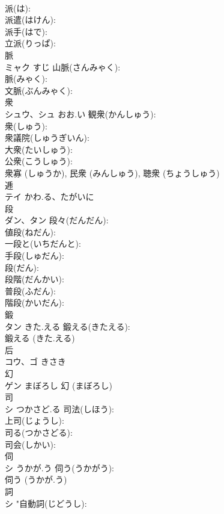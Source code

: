 \documentclass[8pt]{extreport}
\begin{document}
\begin{CJK}{UTF8}{min}
\\	派(は): 
\\	派遣(はけん): 
\\	派手(はで): 
\\	立派(りっぱ): 
\\	脈			
\\	ミャク	すじ	山脈(さんみゃく): 
\\	脈(みゃく): 
\\	文脈(ぶんみゃく): 
\\	衆			
\\	シュウ、シュ	おお.い	観衆(かんしゅう): 
\\	衆(しゅう): 
\\	衆議院(しゅうぎいん): 
\\	大衆(たいしゅう): 
\\	公衆(こうしゅう): 
\\	衆寡 (しゅうか), 民衆 (みんしゅう), 聴衆 (ちょうしゅう)
\\	逓			
\\	テイ	かわ.る、たがいに		
\\	段			
\\	ダン、タン		段々(だんだん): 
\\	値段(ねだん): 
\\	一段と(いちだんと): 
\\	手段(しゅだん): 
\\	段(だん): 
\\	段階(だんかい): 
\\	普段(ふだん): 
\\	階段(かいだん): 
\\	鍛			
\\	タン	きた.える	鍛える(きたえる): 
\\	鍛える (きた.える)
\\	后			
\\	コウ、ゴ	きさき		
\\	幻			
\\	ゲン	まぼろし		幻 (まぼろし)
\\	司			
\\	シ	つかさど.る	司法(しほう): 
\\	上司(じょうし): 
\\	司る(つかさどる): 
\\	司会(しかい): 
\\	伺			
\\	シ	うかが.う	伺う(うかがう): 
\\	伺う (うかが.う)
\\	詞			
\\	シ		"自動詞(じどうし): 

\end{CJK}
\end{document}
